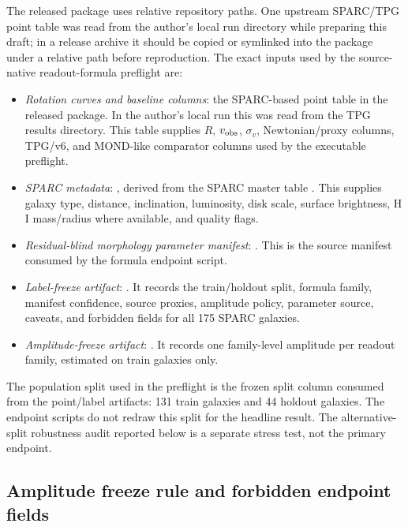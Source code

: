 \documentclass[11pt]{article}
\begin{document}
The released package uses relative repository paths.  One upstream SPARC/TPG
point table was read from the author's local run directory while preparing this
draft; in a release archive it should be copied or symlinked into the package
under a relative path before reproduction.  The exact inputs used by the
source-native readout-formula preflight are:
\begin{itemize}[leftmargin=*]
\item \emph{Rotation curves and baseline columns}: the SPARC-based point table
in the released package.  In the author's local run this was read from the TPG
results directory.
This table supplies \(R\), \(v_{\rm obs}\), \(\sigma_v\), Newtonian/proxy
columns, TPG/v6, and MOND-like comparator columns used by the executable
preflight.
\item \emph{SPARC metadata}: ,
derived from the SPARC master table \cite{Lelli2016SPARC}.  This supplies
galaxy type, distance, inclination, luminosity, disk scale, surface brightness,
H I mass/radius where available, and quality flags.
\item \emph{Residual-blind morphology parameter manifest}:
.  This is the source
manifest consumed by the formula endpoint script.
\item \emph{Label-freeze artifact}:
.  It records the
train/holdout split, formula family, manifest confidence, source proxies,
amplitude policy, parameter source, caveats, and forbidden fields for all 175
SPARC galaxies.
\item \emph{Amplitude-freeze artifact}:
.  It records
one family-level amplitude per readout family, estimated on train galaxies only.
\end{itemize}

The population split used in the preflight is the frozen split column consumed
from the point/label artifacts: 131 train galaxies and 44 holdout galaxies.
The endpoint scripts do not redraw this split for the headline result.  The
alternative-split robustness audit reported below is a separate stress test,
not the primary endpoint.

\subsection{Amplitude freeze rule and forbidden endpoint fields}
\end{document}
